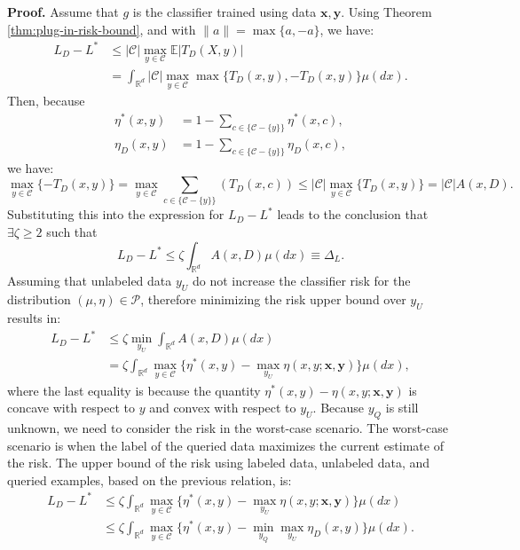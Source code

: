 \documentclass[12pt]{article}
\begin{document}
	\textbf{Proof.} Assume that $g$ is the classifier trained using data $\mathbf{x}, \mathbf{y}$. Using Theorem \ref{thm:plug-in-risk-bound}, and with $\|a\| = \max\{a, -a\}$, we have:
	\begin{align}
		L_D - L^* &\le |\mathcal{C}| \max_{y \in \mathcal{C}} \mathbb{E}|T_D(X, y)| \\
		&= \int_{\mathbb{R}^d} |\mathcal{C}| \max_{y \in \mathcal{C}} \max\{T_D(x, y), -T_D(x, y)\} \mu(dx).
	\end{align}
	Then, because
	\begin{align}
		\eta^*(x, y) &= 1 - \sum_{c \in \{\mathcal{C} - \{y\}\}} \eta^*(x, c), \\
		\eta_D(x, y) &= 1 - \sum_{c \in \{\mathcal{C} - \{y\}\}} \eta_D(x, c),
	\end{align}
	we have:
	\begin{equation}
		\max_{y \in \mathcal{C}} \{ -T_D(x, y) \} = \max_{y \in \mathcal{C}} \sum_{c \in \{\mathcal{C} - \{y\}\}} (T_D(x, c)) \le |\mathcal{C}| \max_{y \in \mathcal{C}} \{ T_D(x, y) \} = |\mathcal{C}| A(x, D).
	\end{equation}
	Substituting this into the expression for $L_D - L^*$ leads to the conclusion that $\exists \zeta \ge 2$ such that
	\begin{equation}
		L_D - L^* \le \zeta \int_{\mathbb{R}^d} A(x, D) \mu(dx) \equiv \Delta_L.
	\end{equation}
	Assuming that unlabeled data $y_U$ do not increase the classifier risk for the distribution $(\mu, \eta) \in \mathcal{P}$, therefore minimizing the risk upper bound over $y_U$ results in:
	\begin{align}
		L_D - L^* &\le \zeta \min_{y_U} \int_{\mathbb{R}^d} A(x, D) \mu(dx) \\
		&= \zeta \int_{\mathbb{R}^d} \max_{y \in \mathcal{C}} \{ \eta^*(x, y) - \max_{y_U} \eta(x, y; \mathbf{x}, \mathbf{y}) \} \mu(dx),
	\end{align}
	where the last equality is because the quantity $\eta^*(x, y) - \eta(x, y; \mathbf{x}, \mathbf{y})$ is concave with respect to $y$ and convex with respect to $y_U$. Because $y_Q$ is still unknown, we need to consider the risk in the worst-case scenario. The worst-case scenario is when the label of the queried data maximizes the current estimate of the risk. The upper bound of the risk using labeled data, unlabeled data, and queried examples, based on the previous relation, is:
	\begin{align}
		L_D - L^* &\le \zeta \int_{\mathbb{R}^d} \max_{y \in \mathcal{C}} \{ \eta^*(x, y) - \max_{y_U} \eta(x, y; \mathbf{x}, \mathbf{y}) \} \mu(dx) \\
		&\le \zeta \int_{\mathbb{R}^d} \max_{y \in \mathcal{C}} \{ \eta^*(x, y) - \min_{y_Q} \max_{y_U} \eta_D(x, y) \} \mu(dx).
	\end{align}
\end{document}
